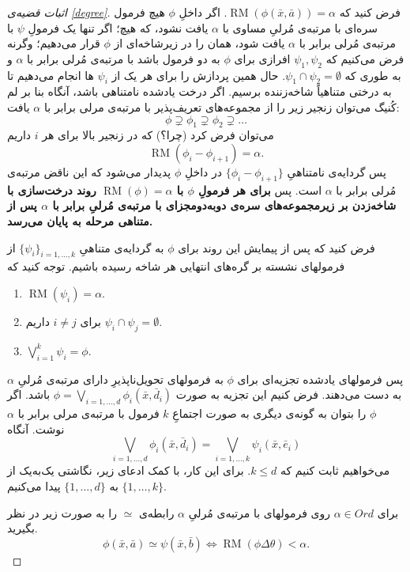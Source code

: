 \documentclass[12pt,a4paper]{report}
\theoremstyle{colorhead}
\DeclareMathOperator{\RM}{RM}
\begin{document}
\begin{proof}[اثبات قضیه‌ی 
\ref{degree}]
	فرض کنید که 
$\RM(\phi(\bar{x},\bar{a}))=\alpha$.
اگر داخلِ
$\phi$
هیچ فرمول سره‌ای با مرتبه‌ی مُرلیِ مساوی با 
$\alpha$
یافت نشود، که هیچ؛ 
اگر تنها یک فرمولِ
$\psi$
با مرتبه‌ی مُرلی برابر با 
$\alpha$
یافت شود، همان را در زیرشاخه‌ای از
$\phi$
قرار می‌دهیم؛ 
وگرنه فرض می‌کنیم که 
$\psi_1,\psi_2$
افرازی برای
$\phi$
به دو فرمول باشد با مرتبه‌ی مُرلی برابر با 
$\alpha$
و به طوری که 
$\psi_1\cap \psi_2=\emptyset$.
حال همین پردازش را برای هر یک از
$\psi_i$
ها انجام می‌دهیم تا به درختی متناهیاً شاخه‌زننده برسیم. اگر درخت یادشده نامتناهی باشد، آنگاه بنا بر
لم کُنیگ می‌توان زنجیر زیر را از مجموعه‌های تعریف‌پذیر با مرتبه‌ی مرلی برابر با
$\alpha$
یافت:
\[
\phi\supsetneq\phi_1\supsetneq  \phi_2\supsetneq\ldots
\]
می‌توان فرض کرد (چرا؟) که در زنجیر بالا برای هر $i$
داریم
\[
\RM(\phi_i-\phi_{i+1})=\alpha.
\]
پس گردایه‌ی نامتناهیِ
$\{\phi_i-\phi_{i+1}\}$
در داخلِ
$\phi$
پدیدار می‌شود که این ناقض مرتبه‌ی مُرلی برابر با 
$\alpha$
است. 
پس 
\textbf{برای هر فرمولِ 
$\phi$
با 
$\RM(\phi)=\alpha$
روند درخت‌سازی با شاخه‌زدن بر زیرمجموعه‌های سره‌ی دوبه‌دومجزای با مرتبه‌ی مُرلیِ برابر با
$\alpha$
پس از متناهی مرحله به پایان می‌رسد. 
}
\par 
فرض کنید که 
پس از پیمایش این روند برای 
$\phi$
به گردایه‌ی متناهیِ
$\{\psi_i\}_{i=1,\ldots,k}$
از فرمولهای نشسته بر گره‌های انتهایی هر شاخه رسیده باشیم. 
توجه کنید که 
\begin{enumerate}
	\item 
	$\RM(\psi_i)=\alpha$.
	\item 
	برای
	$i\not=j$
	داریم
	$\psi_i\cap \psi_j=\emptyset$.
	\item 
	$\bigvee_{i=1}^k \psi_i=\phi$.
\end{enumerate}
پس فرمولهای یادشده تجزیه‌ای برای 
$\phi$
به فرمولهای تحویل‌ناپذیرِ دارای مرتبه‌ی مُرلیِ 
$\alpha$
به دست می‌دهند. 
فرض کنیم این تجزیه به صورت
$\phi=\bigvee_{i=1,\ldots,d}\phi_i(\bar{x},\bar{d}_i)$
باشد. اگر
$\phi$
را بتوان به گونه‌ی دیگری به صورت اجتماعِ
$k$
فرمول با مرتبه‌ی مرلی برابر با
$\alpha$
نوشت. آنگاه
\[
\bigvee_{i=1,\ldots,d} \phi_i(\bar{x},\bar{d}_i)=\bigvee_{i=1,\ldots,k}\psi_i(\bar{x},\bar{e}_i)
\]
می‌خواهیم ثابت کنیم که
$k\leq d$.
برای این کار، با کمک ادعای زیر، نگاشتی یک‌به‌یک از
$\{1,\ldots,k\}$
به
$\{1,\ldots,d\}$
پیدا می‌کنیم.
\par 
برای 
$\alpha\in Ord$
روی فرمولهای با مرتبه‌ی مُرلیِ
$\alpha$
رابطه‌ی
$\simeq$
را به صورت زیر در نظر بگیرید. 
\[
\phi(\bar{x},\bar{a})\simeq \psi(\bar{x},\bar{b})\Leftrightarrow
\RM(\phi\Delta \theta)<\alpha.
\]
\end{proof}
\end{document}

